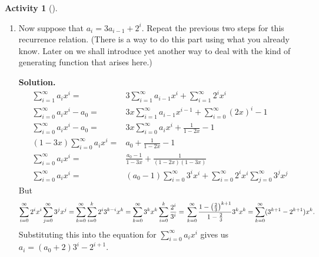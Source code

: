 \documentclass[10pt,]{book}
\theoremstyle{plain}
\theoremstyle{definition}
\newtheorem{activity}[project]{Activity}
\numberwithin{equation}{chapter}
\newcommand{\amp}{&}
\begin{document}
\begin{activity}[]
\begin{enumerate}[label=(\alph*)]
~\par
\item Now suppose that \(a_i=3a_{i-1} + 2^i\).  Repeat the previous two steps for this recurrence relation.  (There is a way to do this part using what you already know.  Later on we shall introduce yet another way to deal with the kind of generating function that arises here.)%
\par\medskip\noindent%
\textbf{Solution.}\quad %
\begin{align*}
\sum_{i=1}^\infty a_ix^i =\amp 3\sum_{i=1}^\infty
a_{i-1}x^i +\sum_{i=1}^\infty 2^ix^i\\
\sum_{i=0}^\infty a_ix^i -a_0  =\amp 3x\sum_{i=1}^\infty a_{i-1}x^{i-1}
+\sum_{i=0}^\infty (2x)^i -1\\
\sum_{i=0}^\infty a_ix^i -a_0  =\amp 3x\sum_{i=0}^\infty a_ix^i +\frac{1}{1-2x} -1\\
(1-3x)\sum_{i=0}^\infty a_ix^i =\amp a_0 +\frac{1}{1-2x}-1\\
\sum_{i=0}^\infty a_ix^i =\amp  \frac{a_0-1}{1-3x}+\frac{1}{(1-2x)(1-3x)}\\
\sum_{i=0}^\infty a_ix^i =\amp (a_0-1)\sum_{i=0}^\infty 3^ix^i +\sum_{i=0}^\infty
2^ix^i\sum_{j=0}^\infty 3^jx^j
\end{align*}
But%
\begin{equation*}
\displaystyle\sum_{i=0}^\infty
2^ix^i\sum_{j=0}^\infty 3^jx^j=
\sum_{k=0}^\infty
\sum_{i=0}^k 2^i3^{k-i}x^k=
\sum_{k=0}^\infty3^kx^k
\sum_{i=0}^k \frac{2^i}{3^i}=\\ \sum_{k=0}^\infty\frac{1-\left(\frac{2}{3}\right)^{k+1}}{1-\frac{2}{3}}3^kx^k=\sum_{k=0}^\infty
(3^{k+1}-2^{k+1})x^k\text{.}
\end{equation*}
Substituting this into the equation for \(\sum_{i=0}^\infty a_ix^i\) gives us \(a_i =(a_0+2)3^i -2^{i+1}\).%

\end{enumerate}
\end{activity}
\end{document}
